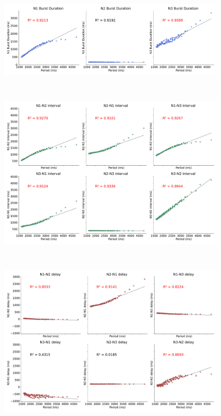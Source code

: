 \begin{figure}[hbt!]
	\begin{minipage}[b]{0.53\textwidth}
		\centering
		\begin{minipage}[b]{\textwidth}
			\centering
			\includegraphics[width=\textwidth]{invariants/data/MODEL/so_driven/images/3phases/_durations.pdf}
		\end{minipage}\
		\begin{minipage}[b]{\textwidth}
			\centering
			\includegraphics[width=\textwidth]{invariants/data/MODEL/so_driven/images/3phases/_intervals.pdf}
		\end{minipage}\
		\begin{minipage}[b]{\textwidth}
			\centering
			\includegraphics[width=\textwidth]{invariants/data/MODEL/so_driven/images/3phases/_delays.pdf}

\end{minipage}
\end{minipage}
\end{figure}
